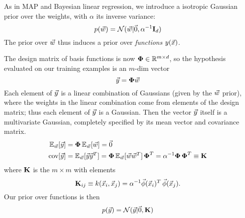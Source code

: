 \documentclass[11pt]{article}
\begin{document}
As in MAP and Bayesian linear regression, we introduce a isotropic Gaussian prior over
the weights, with $\alpha$ its inverse variance:
\begin{equation}
  p(\vec{w}) = \mathcal{N}(\vec{w} | \vec{0}, \alpha^{-1} \mathbf{I}_d)
\end{equation}
The prior over $\vec{w}$ thus induces a prior over \emph{functions} $y(\vec{x})$.

The design matrix of basis functions is now $\boldsymbol{\Phi} \in \mathbb{R}^{m \times d}$, so the
hypothesis evaluated on our training examples is an $m$-dim vector
\begin{equation}
  \vec{y} = \boldsymbol{\Phi} \vec{w}
\end{equation}
Each element of $\vec{y}$ is a linear combination of Gaussians (given by the $\vec{w}$
prior), where the weights in the linear combination come from elements of the design
matrix; thus each element of $\vec{y}$ is a Gaussian. Then the vector $\vec{y}$ itself is a
multivariate Gaussian, completely specified by its mean vector and covariance matrix.
\begin{align}
  \mathbb{E}_{\vec{w}}[\vec{y}] &= \boldsymbol{\Phi}\, \mathbb{E}_{\vec{w}}[\vec{w}] = \vec{0} \\
  \textrm{cov}[\vec{y}]  &= \mathbb{E}_{\vec{w}}[\vec{y} \vec{y}^T]
                      = \boldsymbol{\Phi}\, \mathbb{E}_{\vec{w}}[\vec{w} \vec{w}^T]\, \boldsymbol{\Phi}^T
                      = \alpha^{-1} \boldsymbol{\Phi}\, \boldsymbol{\Phi}^T
                      \equiv \mathbf{K}
\end{align}
where $\mathbf{K}$ is the $m \times m$  with elements
\begin{equation}
  \mathbf{K}_{ij} \equiv k(\vec{x}_i, \vec{x}_j) = \alpha^{-1} \vec{\phi}(\vec{x}_i)^T\,
  \vec{\phi}(\vec{x}_j). 
\end{equation}
Our prior over functions is then
\begin{equation}
  p(\vec{y}) = \mathcal{N}(\vec{y} | \vec{0}, \mathbf{K})
\end{equation}
\end{document}
